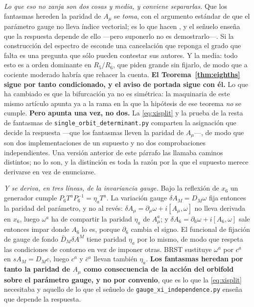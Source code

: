 \documentclass[11pt,a4paper]{article}
\begin{document}
\begin{itemize}
\emph{Lo que eso no zanja son dos cosas y media, y conviene separarlas.} Que los fantasmas hereden
la paridad de $A_\mu$ se \emph{toma}, con el argumento estándar de que el parámetro gauge no lleva
índice vectorial; es lo que hacen \cite{HNT}, y el señuelo enseña que la respuesta depende de
ello ---pero suponerlo no es demostrarlo---. Si la construcción del espectro de \cite{KM25}
esconde una cancelación que reponga el grado que falta es una pregunta que sólo pueden contestar
sus autores. Y la media: todo esto es a orden dominante en $R_5/R_6$, que \cite{KM25} piden grande
sin fijarlo, de modo que a cociente moderado habría que rehacer la cuenta.
\textbf{El Teorema~\ref{thm:eighths} sigue por tanto condicionado, y el aviso de portada sigue con
él.} Lo que ha cambiado es que la bifurcación ya no es simétrica: la maquinaria de este mismo
artículo apunta ya a la rama en la que la hipótesis de ese teorema \emph{no} se cumple.
\textbf{Pero apunta una vez, no dos.} La \eqref{eq:xisplit} y la prueba de la resta de fantasmas de
\texttt{single\_\allowbreak orbit\_\allowbreak determinant.py} comparten la asignación que decide
la respuesta ---que los fantasmas lleven la paridad de $A_\mu$---, de modo que son dos
implementaciones de un supuesto y no dos comprobaciones independientes. Una versión anterior de
este párrafo las llamaba caminos distintos; no lo son, y la distinción es toda la razón por la que
el supuesto merece derivarse en vez de enunciarse.

\emph{Y se deriva, en tres líneas, de la invariancia gauge.} Bajo la reflexión de $x_6$ un generador
cumple $P_6T^aP_6^{-1}=\eta_aT^a$. La variación gauge $\delta A_M=D_M\omega$ fija entonces la
paridad del parámetro, y no al revés: $\delta A_\mu=\partial_\mu\omega+i[A_\mu,\omega]$ no lleva
derivada en $x_6$, luego $\omega^a$ ha de compartir la paridad $\eta_a$ de $A_\mu^a$; y
$\delta A_6=\partial_6\omega+i[A_6,\omega]$ sale entonces impar donde $A_6$ lo es, porque
$\partial_6$ cambia el signo. El funcional de fijación de gauge de fondo $\bar D_M\delta A^M$ tiene
paridad $\eta_a$ por lo mismo, de modo que respeta las condiciones de contorno en vez de imponer
otras. BRST sustituye $\omega^a$ por $c^a$ en $sA_M=D_Mc$, luego $c^a$ y $\bar c^a$ llevan también
$\eta_a$. \textbf{Los fantasmas heredan por tanto la paridad de $A_\mu$ como consecuencia de la
acción del orbifold sobre el parámetro gauge, y no por convenio}, que es lo que la
\eqref{eq:xisplit} necesitaba y aquello de lo que el señuelo de
\texttt{gauge\_\allowbreak xi\_\allowbreak independence.py} enseña que depende la respuesta.


\end{itemize}
\end{document}
